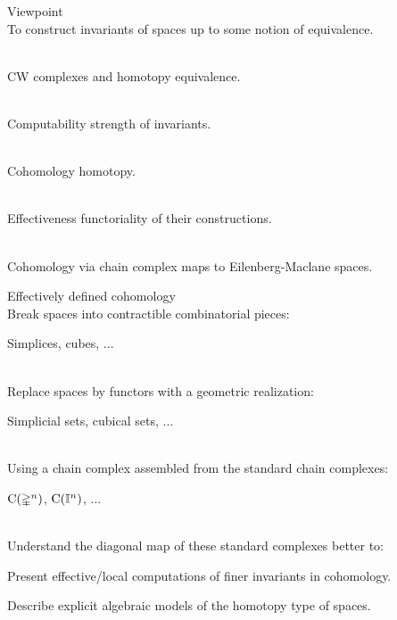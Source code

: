 
\begin{frame}{Viewpoint}
	\pause
	 \\
	To construct invariants of spaces up to some notion of equivalence.

	\bigskip\pause
	 \\
	CW complexes and homotopy equivalence.

	\bigskip\pause
	 \\
	Computability  strength of invariants.

	\bigskip\pause
	 \\
	Cohomology  homotopy.

	\bigskip\pause
	 \\
	Effectiveness  functoriality of their constructions.

	\bigskip\pause
	 \\
	Cohomology via chain complex  maps to Eilenberg-Maclane spaces.
\end{frame}

\begin{frame}{Effectively defined cohomology}
	\pause
	 \\
	Break spaces into contractible combinatorial pieces: \\
	\begin{center}
		Simplices, cubes, ...
	\end{center}

	\pause
	 \\
	Replace spaces by functors with a geometric realization: \\
	\begin{center}
		Simplicial sets, cubical sets, ...
	\end{center}

	\pause
	 \\
	Using a chain complex assembled from the standard chain complexes: \\
	\begin{center}
		$\operatorname{C}(\mathbb{\Delta}^n)$, $\operatorname{C}(\mathbb{I}^n)$, ...
	\end{center}

	\pause
	 \\
	Understand the diagonal map of these standard complexes better to:

	\pause\smallskip
	 Present effective/local computations of finer invariants in cohomology.

	\pause
	 Describe explicit algebraic models of the homotopy type of spaces.
\end{frame}
